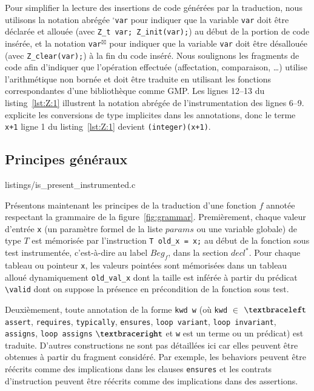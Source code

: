 Pour simplifier la lecture des insertions de code générées par la traduction,
nous utilisons la notation abrégée ${}^{\square}$\lstinline{var} pour indiquer
que la variable \lstinline{var} doit être déclarée et allouée (avec
\lstinline{Z_t var; Z_init(var);}) au début de la portion de code insérée, et la
notation \lstinline{var}${}^{\boxtimes}$ pour indiquer que la variable
\lstinline{var} doit être désallouée (avec \lstinline{Z_clear(var);})
à la fin du code inséré.
Nous soulignons les fragments de code afin d'indiquer que l'opération effectuée
(affectation, comparaison, \dots) utilise l'arithmétique non bornée et doit
être traduite en utilisant les fonctions correspondantes d'une bibliothèque
comme GMP.
Les lignes 12--13 du listing~\ref{lst:Z:1} illustrent la notation abrégée de 
l'instrumentation des lignes 6--9.
\framac explicite les conversions de type implicites dans les annotations, donc
le terme \lstinline'x+1' ligne 1 du listing~\ref{lst:Z:1} devient
\lstinline'(integer)(x+1)'.


\subsection{Principes généraux}
\label{sec:principles}



                {listings/is_present_instrumented.c}


Présentons maintenant les principes de la traduction d'une fonction $f$ annotée
respectant la grammaire de la figure~\ref{fig:grammar}.
Premièrement, chaque valeur d'entrée \lstinline'x' (un paramètre formel de la
liste $params$ ou une variable globale) de type $T$ est mémorisée par
l'instruction \lstinline|T old_x = x;| au début de la fonction sous test
instrumentée, c'est-à-dire au label $Beg_f$, dans la section $decl^{*}$.
Pour chaque tableau ou pointeur \lstinline'x', les valeurs pointées sont
mémorisées dans un tableau alloué dynamiquement \lstinline'old_val_x' dont la
taille est inférée à partir du prédicat \lstinline'\valid' dont on suppose la
présence en précondition de la fonction sous test.

Deuxièmement, toute annotation \eacsl de la forme \lstinline'kwd w' (où
\lstinline'kwd' $\in$ $\bopen$ \lstinline|assert|, \lstinline|requires|,
\lstinline|typically|, \lstinline|ensures|, \lstinline|loop variant|,
\lstinline|loop invariant|, \lstinline|assigns|, \lstinline|loop assigns|
$\bclose$ et \lstinline'w' est un terme ou un prédicat) est traduite.
D'autres constructions \eacsl ne sont pas détaillées ici car elles peuvent être
obtenues à partir du fragment \eacsl considéré.
Par exemple, les behaviors peuvent être réécrits comme des implications dans les
clauses \lstinline'ensures' et les contrats d'instruction peuvent être réécrits
comme des implications dans des assertions.

